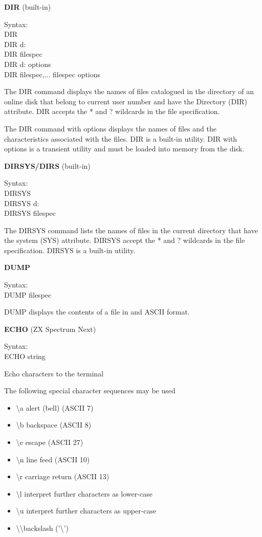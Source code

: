 \textbf{DIR} (built-in)

\hangindent=0.7cm Syntax:\\
DIR\\
DIR d:\\
DIR filespec\\
DIR d: options\\
DIR filespec,... filespec options

The DIR command displays the names of files catalogued in the
directory of an online disk that belong to current user number and
have the Directory (DIR) attribute. DIR accepts the * and ? wildcards
in the file specification.

The DIR command with options displays the names of files and the
characteristics associated with the files. DIR is a built-in
utility. DIR with options is a transient utility and must be loaded
into memory from the disk.

\textbf{DIRSYS/DIRS} (built-in)

\hangindent=0.7cm Syntax:\\
DIRSYS\\
DIRSYS d:\\
DIRSYS filespec

The DIRSYS command lists the names of files in the current directory
that have the system (SYS) attribute. DIRSYS accept the * and ?
wildcards in the file specification. DIRSYS is a built-in utility.

\textbf{DUMP}

\hangindent=0.7cm Syntax:\\
DUMP filespec

DUMP displays the contents of a file in and ASCII format.

\textbf{ECHO} (ZX Spectrum Next)

\hangindent=0.7cm Syntax:\\
ECHO string

Echo characters to the terminal

The following special character sequences may be used
\begin{itemize}
\item \textbackslash a alert (bell) (ASCII 7)
\item \textbackslash b backspace (ASCII 8)
\item \textbackslash e escape (ASCII 27)
\item \textbackslash n line feed (ASCII 10)
\item \textbackslash r carriage return (ASCII 13)
\item \textbackslash l interpret further characters as lower-case
\item \textbackslash u interpret further characters as upper-case
\item \textbackslash\textbackslash backslash ('\textbackslash')
\end{itemize}

